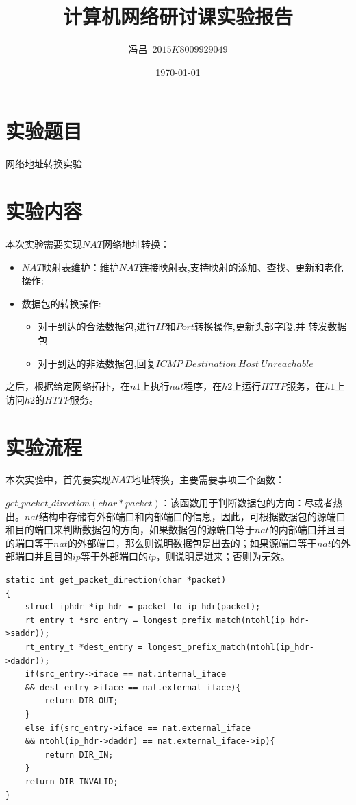 \documentclass[UTF8,noindent]{ctexart}
\title{\CJKfamily{zhkai}计算机网络研讨课实验报告}
\author{{\CJKfamily{zhkai}冯吕}\ $2015K8009929049$}
\date{\today}
\begin{document}
\maketitle
{}
\section*{{实验题目}}网络地址转换实验
\section*{{实验内容}}
本次实验需要实现$NAT$网络地址转换：
\begin{itemize}
  \item $NAT$映射表维护：维护$NAT$连接映射表,支持映射的添加、查找、更新和老化操作;
	\item 数据包的转换操作:
	  \begin{itemize}
		\item 对于到达的合法数据包,进行$IP$和$Port$转换操作,更新头部字段,并
转发数据包
\item 对于到达的非法数据包,回复$ICMP\ Destination\ Host\ Unreachable$
	  \end{itemize}
\end{itemize}

之后，根据给定网络拓扑，在$n1$上执行$nat$程序，在$h2$上运行$HTTP$服务，在$h1$上访问$h2$的$HTTP$服务。
\section*{{实验流程}}
本次实验中，首先要实现$NAT$地址转换，主要需要事项三个函数：

$get\_packet\_direction(char *packet)$：该函数用于判断数据包的方向：尽或者热出。$nat$结构中存储有外部端口和内部端口的信息，因此，可根据数据包的源端口和目的端口来判断数据包的方向，如果数据包的源端口等于$nat$的内部端口并且目的端口等于$nat$的外部端口，那么则说明数据包是出去的；如果源端口等于$nat$的外部端口并且目的$ip$等于外部端口的$ip$，则说明是进来；否则为无效。
\begin{lstlisting}
static int get_packet_direction(char *packet)
{
	struct iphdr *ip_hdr = packet_to_ip_hdr(packet);
	rt_entry_t *src_entry = longest_prefix_match(ntohl(ip_hdr->saddr));
	rt_entry_t *dest_entry = longest_prefix_match(ntohl(ip_hdr->daddr));
	if(src_entry->iface == nat.internal_iface 
	&& dest_entry->iface == nat.external_iface){
		return DIR_OUT;
	}
	else if(src_entry->iface == nat.external_iface 
	&& ntohl(ip_hdr->daddr) == nat.external_iface->ip){
		return DIR_IN;
	}
	return DIR_INVALID;
}
\end{lstlisting}
\end{document}
